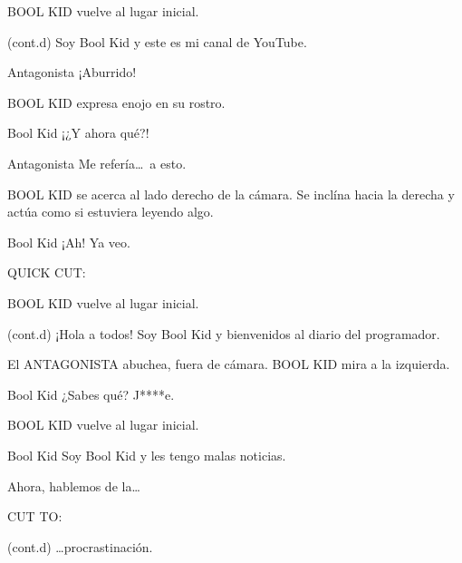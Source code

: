 \documentclass{screenplay}[2018/01/07]
\begin{document}
    BOOL KID vuelve al lugar inicial.

    \begin{dialogue}{(cont.d)}
        Soy Bool Kid y este es mi canal de YouTube.
    \end{dialogue}

    \begin{dialogue}{Antagonista}
        ¡Aburrido!
    \end{dialogue}

    BOOL KID expresa enojo en su rostro.

    \begin{dialogue}{Bool Kid}
        ¡¿Y ahora qué?!
    \end{dialogue}

    \begin{dialogue}{Antagonista}
        Me refería\dots\ a esto.
    \end{dialogue}

    BOOL KID se acerca al lado derecho de la cámara. Se inclína hacia la derecha y actúa como si estuviera leyendo algo.

    \begin{dialogue}{Bool Kid}
        ¡Ah! Ya veo.
    \end{dialogue}

    \begin{flushright}
        QUICK CUT:
    \end{flushright}

    BOOL KID vuelve al lugar inicial.

    \begin{dialogue}{(cont.d)}
        ¡Hola a todos! Soy Bool Kid y bienvenidos al diario del programador.
    \end{dialogue}

    El ANTAGONISTA abuchea, fuera de cámara.
    BOOL KID mira a la izquierda.

    \begin{dialogue}[shouting]{Bool Kid}
        ¿Sabes qué? J****e.
    \end{dialogue}

    BOOL KID vuelve al lugar inicial.

    \begin{dialogue}{Bool Kid}
        Soy Bool Kid y les tengo malas noticias.

        Ahora, hablemos de la\dots
    \end{dialogue}

    \begin{flushright}
        CUT TO:
    \end{flushright}


    \begin{dialogue}{(cont.d)}
        \dots procrastinación.
    \end{dialogue}
    \fadeout

    \theend
\end{document}
